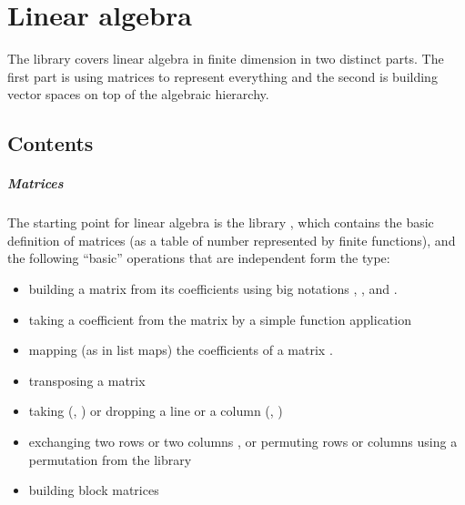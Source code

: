 \chapter{Linear algebra}
\label{linalg:smith}

The library covers linear algebra in finite dimension in two distinct
parts. The first part is using matrices to represent everything and
the second is building vector spaces on top of the algebraic
hierarchy.

\newcommand{\idmat}{\ensuremath{\mathbb{I}}}

\section{Contents}

\paragraph{Matrices}

The starting point for linear algebra is the library
, which contains the basic definition of matrices
(as a table of number represented by finite functions), and the
following ``basic'' operations that are independent form the type:
\begin{itemize}
\item building a matrix from its coefficients using big notations
  , ,  and .
\item taking a coefficient from the matrix by a simple function
  application 
\item mapping (as in list maps) the coefficients of a matrix
  .
\item transposing a matrix 
\item taking (, ) or dropping a line or a column
  (, )
\item exchanging two rows  or two columns , or
  permuting rows  or columns  using a
  permutation from the library 
\item building block matrices
\end{itemize}

